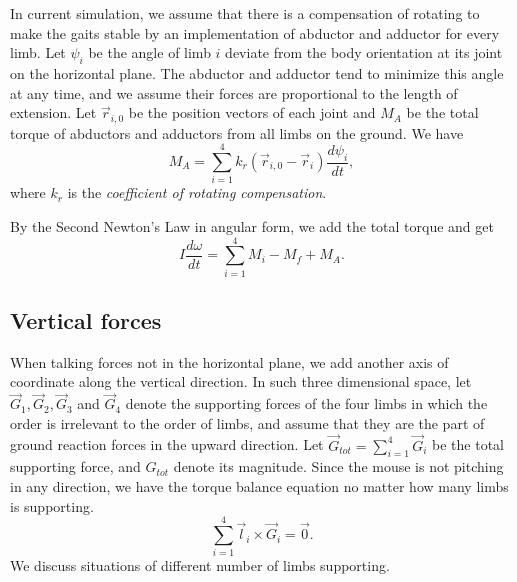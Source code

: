 \documentclass[11pt]{article}
\newcommand{\GT}{G_{tot}}
\begin{document}
In current simulation, we assume that there is a compensation of rotating to make the gaits stable by an implementation of abductor and adductor for every limb. Let $ \psi_i $ be the angle of limb $ i $ deviate from the body orientation at its joint on the horizontal plane. The abductor and adductor tend to minimize this angle at any time, and we assume their forces are proportional to the length of extension. Let $ \vec{r}_{i,0} $ be the position vectors of each joint and $ M_A $ be the total torque of abductors and adductors from all limbs on the ground. We have
\begin{equation}
	M_A = \sum_{i=1}^{4} k_r \left(\vec{r}_{i,0} - \vec{r}_i\right) \frac{d \psi_i}{dt},
\end{equation}
where $ k_r $ is the \textit{coefficient of rotating compensation}. 


By the Second Newton's Law in angular form, we add the total torque and get
\begin{equation}
	I\frac{d\omega}{dt} = \sum_{i=1}^{4} M_i - M_f + M_A.
\end{equation}


\subsection{Vertical forces}\label{sec:load}
When talking forces not in the horizontal plane, we add another axis of coordinate along the vertical direction. In such three dimensional space, let $ \vec{G}_1, \vec{G}_2, \vec{G}_3 $ and $ \vec{G}_4 $ denote the supporting forces of the four limbs in which the order is irrelevant to the order of limbs, and assume that they are the part of ground reaction forces in the upward direction. Let $ \vec{G}_{tot} = \sum_{i=1}^{4} \vec{G}_i $ be the total supporting force, and $ \GT $ denote its magnitude. Since the mouse is not pitching in any direction, we have the torque balance equation no matter how many limbs is supporting.
\begin{equation}\label{eq:sptt}
	\sum_{i=1}^{4} \vec{l}_i \times \vec{G}_i = \vec{0}.
\end{equation}
We discuss situations of different number of limbs supporting.
\end{document}
